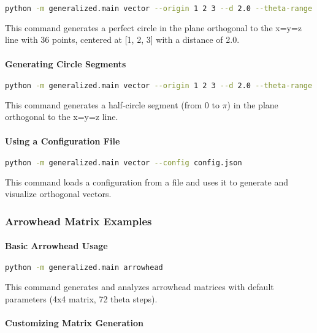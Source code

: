 \begin{lstlisting}[language=bash]
python -m generalized.main vector --origin 1 2 3 --d 2.0 --theta-range 0 36 6.28 --perfect
\end{lstlisting}

This command generates a perfect circle in the plane orthogonal to the x=y=z line with 36 points, centered at [1, 2, 3] with a distance of 2.0.

\paragraph{Generating Circle Segments}

\begin{lstlisting}[language=bash]
python -m generalized.main vector --origin 1 2 3 --d 2.0 --theta-range 0 18 3.14159 --perfect
\end{lstlisting}

This command generates a half-circle segment (from 0 to $\pi$) in the plane orthogonal to the x=y=z line.

\paragraph{Using a Configuration File}

\begin{lstlisting}[language=bash]
python -m generalized.main vector --config config.json
\end{lstlisting}

This command loads a configuration from a file and uses it to generate and visualize orthogonal vectors.

\subsubsection{Arrowhead Matrix Examples}

\paragraph{Basic Arrowhead Usage}

\begin{lstlisting}[language=bash]
python -m generalized.main arrowhead
\end{lstlisting}

This command generates and analyzes arrowhead matrices with default parameters (4x4 matrix, 72 theta steps).

\paragraph{Customizing Matrix Generation}

